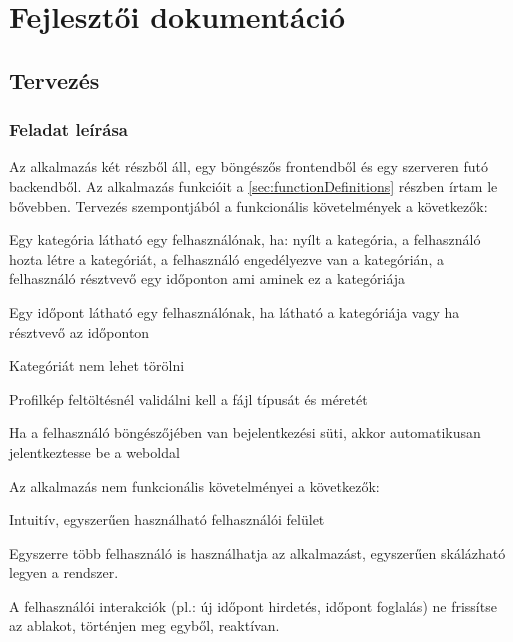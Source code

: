 \chapter{Fejlesztői dokumentáció} %
\label{ch:impl}

\section{Tervezés}

\subsection{Feladat leírása}

Az alkalmazás két részből áll, egy böngészős frontendből és egy szerveren futó backendből. Az alkalmazás funkcióit a \ref{sec:functionDefinitions} részben írtam le bővebben. Tervezés szempontjából a funkcionális követelmények a következők:

\begin{compactitem}
	\item Egy kategória látható egy felhasználónak, ha: nyílt a kategória, a felhasználó hozta létre a kategóriát, a felhasználó engedélyezve van a kategórián, a felhasználó résztvevő egy időponton ami aminek ez a kategóriája
	\item Egy időpont látható egy felhasználónak, ha látható a kategóriája vagy ha résztvevő az időponton
	\item Kategóriát nem lehet törölni
	\item Profilkép feltöltésnél validálni kell a fájl típusát és méretét
	\item Ha a felhasználó böngészőjében van bejelentkezési süti, akkor automatikusan jelentkeztesse be a weboldal
\end{compactitem}

Az alkalmazás nem funkcionális követelményei a következők:

\begin{compactitem}
	\item Intuitív, egyszerűen használható felhasználói felület
	\item Egyszerre több felhasználó is használhatja az alkalmazást, egyszerűen skálázható legyen a rendszer.
	\item A felhasználói interakciók (pl.: új időpont hirdetés, időpont foglalás) ne frissítse az ablakot, történjen meg egyből, reaktívan.
\end{compactitem}

\clearpage

